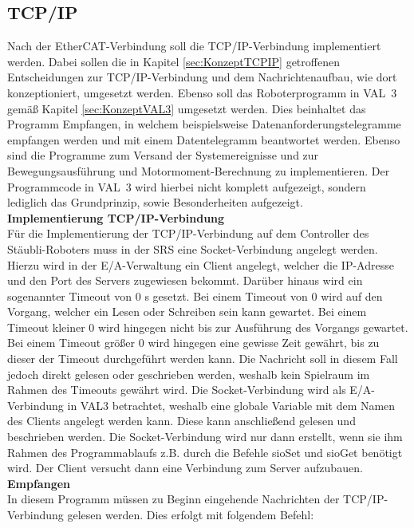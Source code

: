 \documentclass[ a4paper,
                oneside,
                toc=bibliography,
                toc=listof
                ]{scrbook}
\begin{document}
	\subsection{TCP/IP}
	Nach der EtherCAT-Verbindung soll die TCP/IP-Verbindung implementiert werden. Dabei sollen die in Kapitel \ref{sec:KonzeptTCPIP} getroffenen Entscheidungen zur TCP/IP-Verbindung  und dem Nachrichtenaufbau, wie dort konzeptioniert, umgesetzt werden. Ebenso soll das Roboterprogramm in VAL~3 gemäß Kapitel \ref{sec:KonzeptVAL3} umgesetzt werden. Dies beinhaltet das Programm Empfangen, in welchem beispielsweise Datenanforderungstelegramme empfangen werden und mit einem Datentelegramm beantwortet werden. Ebenso sind die Programme zum Versand der Systemereignisse und zur Bewegungsausführung und Motormoment-Berechnung zu implementieren. Der Programmcode in VAL~3 wird hierbei nicht komplett aufgezeigt, sondern lediglich das Grundprinzip, sowie Besonderheiten aufgezeigt.\vspace{0.5\baselineskip}\\
	\textbf{Implementierung TCP/IP-Verbindung}\\
	Für die Implementierung der TCP/IP-Verbindung auf dem Controller des Stäubli-Roboters muss in der SRS eine Socket-Verbindung angelegt werden. Hierzu wird in der E/A-Verwaltung ein Client angelegt, welcher die IP-Adresse und den Port des Servers zugewiesen bekommt. Darüber hinaus wird ein sogenannter Timeout von 0 s gesetzt. Bei einem Timeout von 0 wird auf den Vorgang, welcher ein Lesen oder Schreiben sein kann gewartet. Bei einem Timeout kleiner 0 wird hingegen nicht bis zur Ausführung des Vorgangs gewartet. Bei einem Timeout größer 0 wird hingegen eine gewisse Zeit gewährt, bis zu dieser der Timeout durchgeführt werden kann. Die Nachricht soll in diesem Fall jedoch direkt gelesen oder geschrieben werden, weshalb kein Spielraum im Rahmen des Timeouts gewährt wird. \cite{VAL3} Die Socket-Verbindung wird als E/A-Verbindung in VAL3 betrachtet, weshalb eine globale Variable mit dem Namen des Clients angelegt werden kann. Diese kann anschließend gelesen und beschrieben werden. Die Socket-Verbindung wird nur dann erstellt, wenn sie ihm Rahmen des Programmablaufs z.B. durch die Befehle sioSet und sioGet benötigt wird. Der Client versucht dann eine Verbindung zum Server aufzubauen. \cite{VAL3} \cite{CS9_TCP} \vspace{0.5\baselineskip}\\
	\textbf{Empfangen}\\
	In diesem Programm müssen zu Beginn eingehende Nachrichten der TCP/IP-Verbindung gelesen werden. Dies erfolgt mit folgendem Befehl:
\end{document}
